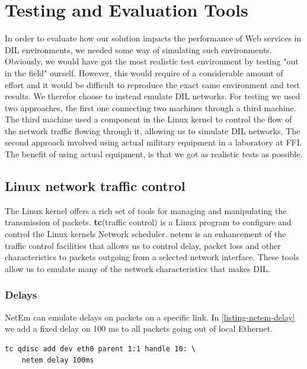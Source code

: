 \section{Testing and Evaluation Tools}

In order to evaluate how our solution impacts the performance of Web services in
DIL environments, we needed some way of simulating such environments. Obviously,
we would have got the most realistic test environment by testing "out in the
field" ourself. However, this would require of a considerable amount of effort
and it would be difficult to reproduce the exact same environment and test
results. We therefor choose to instead emulate DIL networks. For testing we used
two approaches, the first one connecting two machines through a third machine.
The third machine used a component in the Linux kernel to control the flow
of the network traffic flowing through it, allowing us to simulate DIL networks.
The second approach involved using actual military equipment in a laboratory at
FFI. The benefit of using actual equipment, is that we got as realistic tests as
possible.


\subsection{Linux network traffic control}

The Linux kernel offers a rich set of tools for managing and manipulating the
transmission of packets. \textbf{tc}(traffic control) is a Linux program to
configure and control the Linux kernels Network scheduler. \gls{netem} is an
enhancement of the traffic control facilities that allows us to control delay,
packet loss and other characteristics to packets outgoing from a selected
network interface\cite{man-netem}. These tools allow us to emulate many of the network
characteristics that makes DIL.


\subsubsection{Delays}

NetEm can emulate delays on packets on a specific link. In
\cref{listing-netem-delay} we add a fixed delay on 100 ms to all packets going
out of local Ethernet.

\begin{lstlisting}[frame=single, caption="Emulating delay", label=listing-netem-delay]
  tc qdisc add dev eth0 parent 1:1 handle 10: \
    netem delay 100ms
\end{lstlisting}

